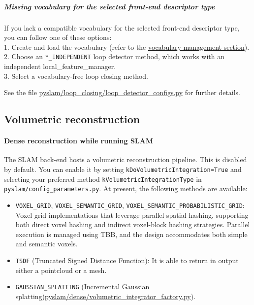\documentclass{article}
\let\oldparagraph\paragraph
\renewcommand{\paragraph}[1]{\oldparagraph{#1}\mbox{}}
\let\oldsubparagraph\subparagraph
\renewcommand{\subparagraph}[1]{\oldsubparagraph{#1}\mbox{}}
\begin{document}
\hypertarget{missing-vocabulary-for-the-selected-front-end-descriptor-type}{%
\subparagraph{Missing vocabulary for the selected front-end descriptor
type}\label{missing-vocabulary-for-the-selected-front-end-descriptor-type}}

If you lack a compatible vocabulary for the selected front-end
descriptor type, you can follow one of these options:\\
1. Create and load the vocabulary (refer to the
\protect\hyperlink{vocabulary-management}{vocabulary management
section}).\\
2. Choose an \texttt{*\_INDEPENDENT} loop detector method, which works
with an independent local\_feature\_manager.\\
3. Select a vocabulary-free loop closing method.

See the file \href{https://github.com/luigifreda/pyslam/blob/master/pyslam/loop_closing/loop_detector_configs.py}{pyslam/loop\_closing/loop\_detector\_configs.py} for further
details.

\hypertarget{volumetric-reconstruction}{%
\subsection{Volumetric reconstruction}\label{volumetric-reconstruction}}

\hypertarget{dense-reconstruction-while-running-slam}{%
\paragraph{Dense reconstruction while running
SLAM}\label{dense-reconstruction-while-running-slam}}

The SLAM back-end hosts a volumetric reconstruction pipeline. This is
disabled by default. You can enable it by setting
\texttt{kDoVolumetricIntegration=True} and selecting your preferred
method \texttt{kVolumetricIntegrationType} in
\texttt{pyslam/config\_parameters.py}. At present, the following methods
are available: 
\begin{itemize}
\item \texttt{VOXEL\_GRID}, \texttt{VOXEL\_SEMANTIC\_GRID},
\texttt{VOXEL\_SEMANTIC\_PROBABILISTIC\_GRID}: Voxel grid
implementations that leverage parallel spatial hashing, supporting both
direct voxel hashing and indirect voxel-block hashing strategies.
Parallel execution is managed using TBB, and the design accommodates
both simple and semantic voxels. 
\item \texttt{TSDF} (Truncated Signed
Distance Function): It is able to return in output either a pointcloud
or a mesh. 
\item  \texttt{GAUSSIAN\_SPLATTING} (Incremental Gaussian
splatting)\href{https://github.com/luigifreda/pyslam/blob/master/pyslam/dense/volumetric_integrator_factory.py}{pyslam/dense/volumetric\_integrator\_factory.py}). 
\end{itemize}
\end{document}
